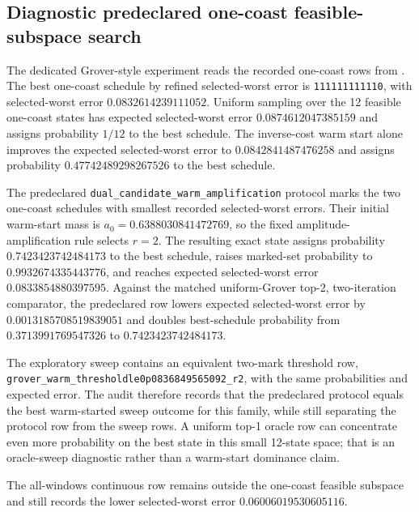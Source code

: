 \documentclass[preprint,12pt]{elsarticle}
\begin{document}
\subsection{Diagnostic predeclared one-coast feasible-subspace search}

The dedicated Grover-style experiment reads the recorded one-coast rows from . The best one-coast schedule by refined selected-worst error is \texttt{111111111110}, with selected-worst error $0.0832614239111052$. Uniform sampling over the 12 feasible one-coast states has expected selected-worst error $0.0874612047385159$ and assigns probability $1/12$ to the best schedule. The inverse-cost warm start alone improves the expected selected-worst error to $0.0842841487476258$ and assigns probability $0.47742489298267526$ to the best schedule.

The predeclared \texttt{dual\_candidate\_warm\_amplification} protocol marks the two one-coast schedules with smallest recorded selected-worst errors. Their initial warm-start mass is $a_0=0.6388030841472769$, so the fixed amplitude-amplification rule selects $r=2$. The resulting exact state assigns probability $0.7423423742484173$ to the best schedule, raises marked-set probability to $0.9932674335443776$, and reaches expected selected-worst error $0.0833854880397595$. Against the matched uniform-Grover top-2, two-iteration comparator, the predeclared row lowers expected selected-worst error by $0.0013185708519839051$ and doubles best-schedule probability from $0.3713991769547326$ to $0.7423423742484173$.

The exploratory sweep contains an equivalent two-mark threshold row, \texttt{grover\_warm\_thresholdle0p0836849565092\_r2}, with the same probabilities and expected error. The audit therefore records that the predeclared protocol equals the best warm-started sweep outcome for this family, while still separating the protocol row from the sweep rows. A uniform top-1 oracle row can concentrate even more probability on the best state in this small 12-state space; that is an oracle-sweep diagnostic rather than a warm-start dominance claim.

The all-windows continuous row remains outside the one-coast feasible subspace and still records the lower selected-worst error $0.06006019530605116$.

\begin{table}[t]
\centering
\caption{Diagnostic one-coast feasible-subspace amplitude amplification over the 12 feasible Hamming-weight-11 schedules. The \texttt{predeclared\_protocol} row is retained as a top-2-oracle ablation; \texttt{exploratory\_sweep} rows are diagnostics.}
\label{tab:structured_grover_one_coast}
\resizebox{\textwidth}{!}{}
\end{table}
\end{document}
